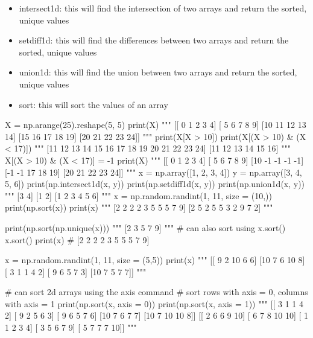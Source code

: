 
\begin{itemize}
	\item intersect1d: this will find the intersection of two arrays and return the sorted, unique values
	\item setdiff1d: this will find the differences between two arrays and return the sorted, unique values
	\item union1d: this will find the union between two arrays and return the sorted, unique values
	\item sort: this will sort the values of an array 
\end{itemize}

\begin{python}
	X = np.arange(25).reshape(5, 5)
	print(X)
	"""
	[[ 0  1  2  3  4]
	[ 5  6  7  8  9]
	[10 11 12 13 14]
	[15 16 17 18 19]
	[20 21 22 23 24]]
	"""
	print(X[X > 10])
	print(X[(X > 10) & (X < 17)])
	"""
	[11 12 13 14 15 16 17 18 19 20 21 22 23 24]
	[11 12 13 14 15 16]
	"""
	X[(X > 10) & (X < 17)] = -1
	print(X)
	"""
	[[ 0  1  2  3  4]
	[ 5  6  7  8  9]
	[10 -1 -1 -1 -1]
	[-1 -1 17 18 19]
	[20 21 22 23 24]]
	"""
	x = np.array([1, 2, 3, 4])
	y = np.array([3, 4, 5, 6])
	print(np.intersect1d(x, y))
	print(np.setdiff1d(x, y))
	print(np.union1d(x, y))
	"""
	[3 4]
	[1 2]
	[1 2 3 4 5 6]
	"""
	x = np.random.randint(1, 11, size = (10,))
	print(np.sort(x))
	print(x)
	"""
	[2 2 2 2 3 5 5 5 7 9]
	[2 5 2 5 5 3 2 9 7 2]
	"""
	
	print(np.sort(np.unique(x)))
	"""
	[2 3 5 7 9]
	"""
	# can also sort using x.sort()
	x.sort()
	print(x)
	# [2 2 2 2 3 5 5 5 7 9]
	
	x = np.random.randint(1, 11, size = (5,5))
	print(x)
	"""
	[[ 9  2 10  6  6]
	[10  7  6 10  8]
	[ 3  1  1  4  2]
	[ 9  6  5  7  3]
	[10  7  5  7  7]]
	"""
	
	# can sort 2d arrays using the axis command
	# sort rows with axis = 0, columns with axis = 1
	print(np.sort(x, axis = 0))
	print(np.sort(x, axis = 1))
	"""
	[[ 3  1  1  4  2]
	[ 9  2  5  6  3]
	[ 9  6  5  7  6]
	[10  7  6  7  7]
	[10  7 10 10  8]]
	[[ 2  6  6  9 10]
	[ 6  7  8 10 10]
	[ 1  1  2  3  4]
	[ 3  5  6  7  9]
	[ 5  7  7  7 10]]
	"""
\end{python}